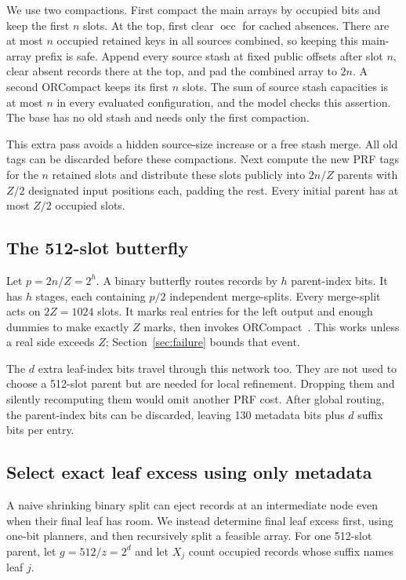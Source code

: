 \documentclass[11pt]{article}
\newcommand{\occ}{\operatorname{occ}}
\begin{document}
We use two compactions. First compact the main arrays by occupied bits and
keep the first $n$ slots. At the top, first clear $\occ$ for cached absences.
There are at most $n$ occupied retained keys in all sources combined, so
keeping this main-array prefix is safe. Append every source stash at fixed
public offsets after slot $n$, clear absent records there at the top, and
pad the combined array to $2n$. A second ORCompact keeps its first $n$
slots. The sum of source stash capacities is at most $n$ in every evaluated
configuration, and the model checks this assertion. The base has no old
stash and needs only the first compaction.

This extra pass avoids a hidden source-size increase or a free stash merge.
All old tags can be discarded before these compactions. Next compute the
new PRF tags for the $n$ retained slots and distribute these slots publicly
into $2n/Z$ parents with $Z/2$ designated input positions each, padding
the rest. Every initial parent has at most $Z/2$ occupied slots.

\subsection{The 512-slot butterfly}
Let $p=2n/Z=2^h$. A binary butterfly routes records by $h$ parent-index
bits. It has $h$ stages, each containing $p/2$ independent merge-splits.
Every merge-split acts on $2Z=1024$ slots. It marks real entries for the
left output and enough dummies to make exactly $Z$ marks, then invokes
ORCompact~\cite{orcompact}. This works unless a real side exceeds $Z$;
Section~\ref{sec:failure} bounds that event.

The $d$ extra leaf-index bits travel through this network too. They are
not used to choose a 512-slot parent but are needed for local refinement.
Dropping them and silently recomputing them would omit another PRF cost.
After global routing, the parent-index bits can be discarded, leaving
130 metadata bits plus $d$ suffix bits per entry.

\subsection{Select exact leaf excess using only metadata}\label{sec:selection}
A naive shrinking binary split can eject records at an intermediate node
even when their final leaf has room. We instead determine final leaf excess
first, using one-bit planners, and then recursively split a feasible array.
For one 512-slot parent, let $g=512/z=2^d$ and let $X_j$ count occupied
records whose suffix names leaf $j$.
\end{document}
